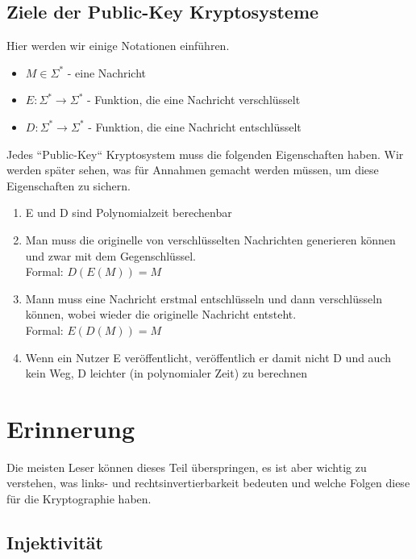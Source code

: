 \documentclass[12pt,a4paper]{article}
\theoremstyle{definition}
\begin{document}
    \subsection{Ziele der Public-Key Kryptosysteme}
    Hier werden wir einige Notationen einführen.

    \begin{itemize}
        \item $M \in \Sigma^*$ - eine Nachricht
        \item $E: \Sigma^* \longrightarrow \Sigma^*$ - Funktion, die eine Nachricht verschlüsselt
        \item $D: \Sigma^* \longrightarrow \Sigma^*$ - Funktion, die eine Nachricht entschlüsselt
    \end{itemize}

    Jedes ``Public-Key`` Kryptosystem muss die folgenden Eigenschaften haben. Wir werden später sehen, was für
    Annahmen gemacht werden müssen, um diese Eigenschaften zu sichern.

    \begin{enumerate}
        \item E und D sind Polynomialzeit berechenbar
        \item Man muss die originelle von verschlüsselten Nachrichten generieren können und zwar mit dem Gegenschlüssel. \\
        Formal: $D(E(M)) = M$
        \item Mann muss eine Nachricht erstmal entschlüsseln und dann verschlüsseln können, wobei wieder die originelle
        Nachricht entsteht. \\
        Formal: $E(D(M)) = M$
        \item Wenn ein Nutzer E veröffentlicht, veröffentlich er damit nicht D und auch kein Weg, D leichter
        (in polynomialer Zeit) zu berechnen
    \end{enumerate}

    \section{Erinnerung}

    Die meisten Leser können dieses Teil überspringen, es ist aber wichtig zu verstehen, was links- und
    rechtsinvertierbarkeit bedeuten und welche Folgen diese für die Kryptographie haben.

    \subsection{Injektivität}
\end{document}
